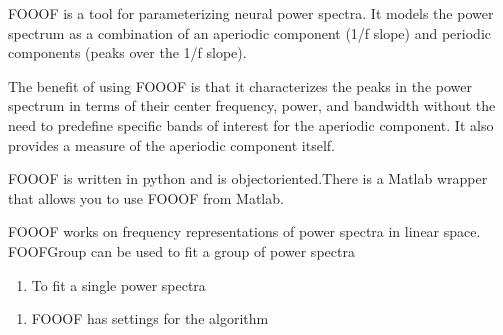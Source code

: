 \documentclass[letterpaper,10pt,english]{sphinxmanual}
\begin{document}
\sphinxAtStartPar
FOOOF is a tool for parameterizing neural power spectra. It models the power spectrum as a combination of an aperiodic component (1/f slope) and periodic components (peaks over the 1/f slope).

\sphinxAtStartPar
The benefit of using FOOOF is that it characterizes the peaks in the power spectrum in terms of their center frequency, power, and bandwidth without the need to predefine specific bands of interest for the aperiodic component. It also provides a measure of the aperiodic component itself.

\sphinxAtStartPar
FOOOF is written in python and is object\sphinxhyphen{}oriented.There is a Matlab wrapper that allows you to use FOOOF from Matlab.

\sphinxAtStartPar
FOOOF works on frequency representations of power spectra in linear space. FOOFGroup can be used to fit a group of power spectra
\begin{enumerate}
%
\item {} 
\sphinxAtStartPar
To fit a single power spectra \sphinxhyphen{}

\end{enumerate}

\begin{sphinxVerbatim}[commandchars=\\\{\}]
   

  

  \PYG{p}{[} \PYG{p}{]}

  
\end{sphinxVerbatim}
\begin{enumerate}
%
\setcounter{enumi}{1}
\item {} 
\sphinxAtStartPar
FOOOF has settings for the algorithm \sphinxhyphen{}

\end{enumerate}
\end{document}
